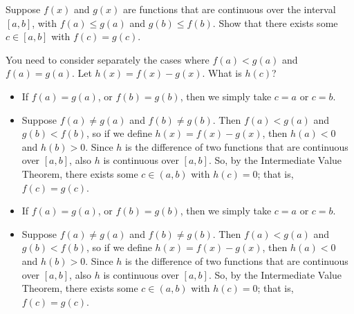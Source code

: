 \begin{question}
Suppose $f(x)$ and $g(x)$ are functions that are continuous over the interval $[a,b]$, with $f(a) \leq g(a)$ and $g(b)\leq f(b)$. Show that there exists some $c \in [a,b]$ with $f(c)=g(c)$.
\end{question}
\begin{hint}
You need to consider separately the cases where $f(a) < g(a)$ and $f(a)=g(a)$. Let $h(x)=f(x)-g(x)$. What is $h(c)$?
\end{hint}
\begin{answer}
\begin{itemize}
\item If $f(a)=g(a)$, or $f(b)=g(b)$, then we simply take $c=a$ or $c=b$.
\item Suppose $f(a) \neq g(a)$ and $f(b) \neq g(b)$. Then $f(a)<g(a)$ and $g(b)<f(b)$, so if we define $h(x)=f(x)-g(x)$, then $h(a)<0$ and $h(b)>0$. Since $h$ is the difference of two functions that are continuous over $[a,b]$, also $h$ is continuous over $[a,b]$. So, by the Intermediate Value Theorem, there exists some $c \in (a,b)$ with $h(c)=0$; that is, $f(c)=g(c)$.
\end{itemize}
\end{answer}
\begin{solution}
\begin{itemize}
\item If $f(a)=g(a)$, or $f(b)=g(b)$, then we simply take $c=a$ or $c=b$.
\item Suppose $f(a) \neq g(a)$ and $f(b) \neq g(b)$. Then $f(a)<g(a)$ and $g(b)<f(b)$, so if we define $h(x)=f(x)-g(x)$, then $h(a)<0$ and $h(b)>0$. Since $h$ is the difference of two functions that are continuous over $[a,b]$, also $h$ is continuous over $[a,b]$. So, by the Intermediate Value Theorem, there exists some $c \in (a,b)$ with $h(c)=0$; that is, $f(c)=g(c)$.
\end{itemize}
\end{solution}
